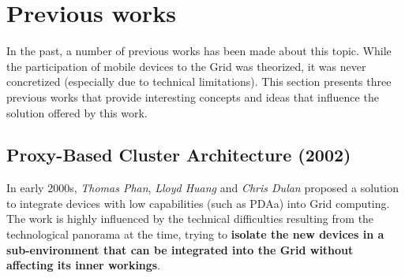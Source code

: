 \section{Previous works}
In the past, a number of previous works has been made about this topic. While the participation of mobile devices to the Grid was theorized, it was never concretized (especially due to technical limitations). This section presents three previous works that provide interesting concepts and ideas that influence the solution offered by this work.

\subsection{Proxy-Based Cluster Architecture (2002)}\label{proxy_based_cluster_architecture}
In early 2000s, \textit{Thomas Phan}, \textit{Lloyd Huang} and \textit{Chris Dulan} proposed a solution to integrate devices with low capabilities (such as PDAa) into Grid computing. The work is highly influenced by the technical difficulties resulting from the technological panorama at the time, trying to \textbf{isolate the new devices in a sub-environment that can be integrated into the Grid without affecting its inner workings}.

